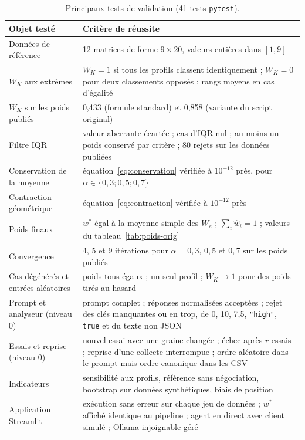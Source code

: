 \documentclass[11pt,a4paper]{article}
\newcommand{\Wbar}{\bar{W}}
\newcommand{\code}[1]{\texttt{#1}}
\begin{document}
\begin{table}[htbp]
\centering
\caption{Principaux tests de validation (41 tests \code{pytest}).}
\label{tab:tests}
\small
\begin{tabular}{@{}p{4.3cm}p{10.9cm}@{}}
\toprule
Objet testé & Critère de réussite \\
\midrule
Données de référence & 12 matrices de forme $9\times20$, valeurs entières dans $[1,9]$ \\
$W_K$ aux extrêmes & $W_K=1$ si tous les profils classent identiquement ; $W_K=0$ pour deux classements opposés ; rangs moyens en cas d'égalité \\
$W_K$ sur les poids publiés & 0,433 (formule standard) et 0,858 (variante du script original) \\
Filtre IQR & valeur aberrante écartée ; cas d'IQR nul ; au moins un poids conservé par critère ; 80 rejets sur les données publiées \\
Conservation de la moyenne & équation~\eqref{eq:conservation} vérifiée à $10^{-12}$ près, pour $\alpha\in\{0{,}3;0{,}5;0{,}7\}$ \\
Contraction géométrique & équation~\eqref{eq:contraction} vérifiée à $10^{-12}$ près \\
Poids finaux & $w^*$ égal à la moyenne simple des $\Wbar_e$ ; $\sum_i\hat w_i=1$ ; valeurs du tableau~\ref{tab:poids-orig} \\
Convergence & 4, 5 et 9 itérations pour $\alpha=0{,}3$, $0{,}5$ et $0{,}7$ sur les poids publiés \\
Cas dégénérés et entrées aléatoires & poids tous égaux ; un seul profil ; $W_K\to1$ pour des poids tirés au hasard \\
Prompt et analyseur (niveau 0) & prompt complet ; réponses normalisées acceptées ; rejet des clés manquantes ou en trop, de 0, 10, 7,5, \code{"high"}, \code{true} et du texte non JSON \\
Essais et reprise (niveau 0) & nouvel essai avec une graine changée ; échec après $r$ essais ; reprise d'une collecte interrompue ; ordre aléatoire dans le prompt mais ordre canonique dans les CSV \\
Indicateurs & sensibilité aux profils, référence sans négociation, bootstrap sur données synthétiques, biais de position \\
Application Streamlit & exécution sans erreur sur chaque jeu de données ; $w^*$ affiché identique au pipeline ; agent en direct avec client simulé ; Ollama injoignable géré \\
\bottomrule
\end{tabular}
\end{table}
\end{document}
